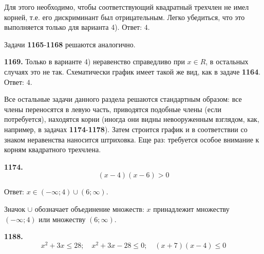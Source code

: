 Для этого необходимо, чтобы соответствующий квадратный трехчлен не имел корней, т.е. его дискриминант был отрицательным. Легко убедиться, что это выполняется только для варианта 4). \newline \null \hspace*{\fill} Ответ: $4$.    

Задачи \textbf{1165}-\textbf{1168} решаются аналогично.

\textbf{1169.}  Только в варианте 4) неравенство справедливо при $x\in R$, в остальных случаях это не так. Схематически график имеет такой же вид, как в задаче \textbf{1164}. \newline \null \hspace*{\fill} Ответ: $4$. 

Все остальные задачи данного раздела решаются стандартным образом: все члены переносятся в левую часть, приводятся подобные члены (если потребуется), находятся корни (иногда они видны невооруженным взглядом, как, например, в задачах \textbf{1174}-\textbf{1178}). Затем строится график и в соответствии со знаком неравенства наносится штриховка. Еще раз: требуется особое внимание к корням квадратного трехчлена. 

\textbf{1174.} $$(x-4)(x-6)>0$$                 

\begin{figure}[h!]
\end{figure}

\null \hspace*{\fill} Ответ: $x\in(-\infty;4)\cup(6;\infty)$.

Значок $\cup$ обозначает объединение множеств: $x$ принадлежит множеству $(-\infty;4)$ или множеству $(6;\infty)$.
 
\textbf{1188.} $$x^2+3x\leq28;\quad x^2+3x-28\leq0;\quad (x+7)(x-4)\leq0$$ 

\begin{figure}[h!]
\end{figure}

